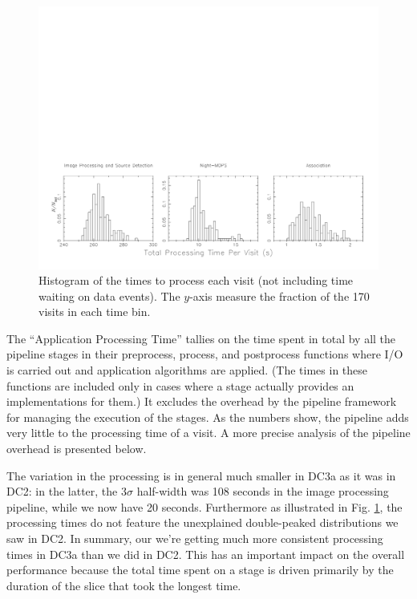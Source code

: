 \begin{figure}[htbp]
\begin{center}
\includegraphics[width=\textwidth]{images/visitdist.pdf}
\caption{Histogram of the times to process each visit (not including
  time waiting on data events).  The $y$-axis measure the fraction of
  the 170 visits in each time bin.  
\label{fig:visitdist}}
\end{center}
\end{figure}


The ``Application Processing Time'' tallies on the time spent in total
by all the pipeline stages in their preprocess, process, and
postprocess functions where I/O is carried out and application
algorithms are applied.  (The times in these functions are included
only in cases where a stage actually provides an implementations for
them.)  It excludes the overhead by the pipeline framework for
managing the execution of the stages.  As the numbers show, the
pipeline adds very little to the processing time of a visit.  A more
precise analysis of the pipeline overhead is presented below.  

The variation in the processing is in general much smaller in DC3a as
it was in DC2: in the latter, the $3\sigma$ half-width was 108
seconds in the image processing pipeline, while we now have 20
seconds.  Furthermore as illustrated in Fig. \ref{fig:visitdist}, the
processing times do not feature the unexplained double-peaked
distributions we saw in DC2.  In summary, our we're getting much more
consistent processing times in DC3a than we did in DC2.  This has an
important impact on the overall performance because the total time
spent on a stage is driven primarily by the duration of the slice that
took the longest time.  

